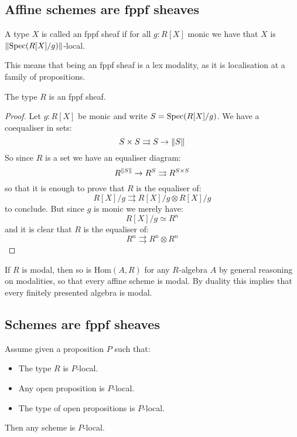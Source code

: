 \label{fppf-sheaves}

\subsection{Affine schemes are fppf sheaves}

\begin{definition}
A type $X$ is called an fppf sheaf if for all $g:R[X]$ monic we have that $X$ is $\lVert \operatorname{Spec}(R[X]/g) \rVert$-local.
\end{definition}

This means that being an fppf sheaf is a lex modality, as it is localisation at a family of propositions.

\begin{lemma}\label{fppf-subcanonical}
The type $R$ is an fppf sheaf.
\end{lemma}

\begin{proof}
Let $g:R[X]$ be monic and write $S=\operatorname{Spec}(R[X]/g)$. We have a coequaliser in sets:
\[S\times S\rightrightarrows S \to \lVert S \rVert\]
So since $R$ is a set we have an equaliser diagram:
\[R^{\lVert S \rVert} \to R^S\rightrightarrows R^{S\times S}\]
so that it is enough to prove that $R$ is the equaliser of:
\[R[X]/g \rightrightarrows R[X]/g \otimes R[X]/g\]
to conclude. But since $g$ is monic we merely have:
\[R[X]/g \simeq R^n\]
and it is clear that $R$ is the equaliser of:
\[R^n \rightrightarrows R^n\otimes R^n\]
\end{proof}

\begin{remark}\label{R-modal-subcanonical}
If $R$ is modal, then so is $\mathrm{Hom}(A,R)$ for any $R$-algebra $A$ by general reasoning on modalities, so that every affine scheme is modal. By duality this implies that every finitely presented algebra is modal.
\end{remark}


\subsection{Schemes are fppf sheaves}

\begin{lemma}\label{scheme-are-sheaf-from-affine}
Assume given a proposition $P$ such that:
\begin{itemize}
\item The type $R$ is $P$-local.
\item Any open proposition is $P$-local.
\item The type of open propositions is $P$-local.
\end{itemize}
Then any scheme is $P$-local.
\end{lemma}

